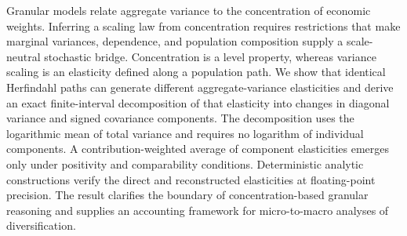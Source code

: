 Granular models relate aggregate variance to the concentration of
economic weights. Inferring a scaling law from concentration requires
restrictions that make marginal variances, dependence, and population
composition supply a scale-neutral stochastic bridge. Concentration is a level property, whereas variance
scaling is an elasticity defined along a population path. We show that
identical Herfindahl paths can generate different aggregate-variance
elasticities and derive an exact finite-interval decomposition of that
elasticity into changes in diagonal variance and signed covariance
components. The decomposition uses the logarithmic mean of total
variance and requires no logarithm of individual components. A
contribution-weighted average of component elasticities emerges only
under positivity and comparability conditions. Deterministic analytic
constructions verify the direct and reconstructed elasticities at
floating-point precision. The result clarifies the boundary of
concentration-based granular reasoning and supplies an accounting
framework for micro-to-macro analyses of diversification.
